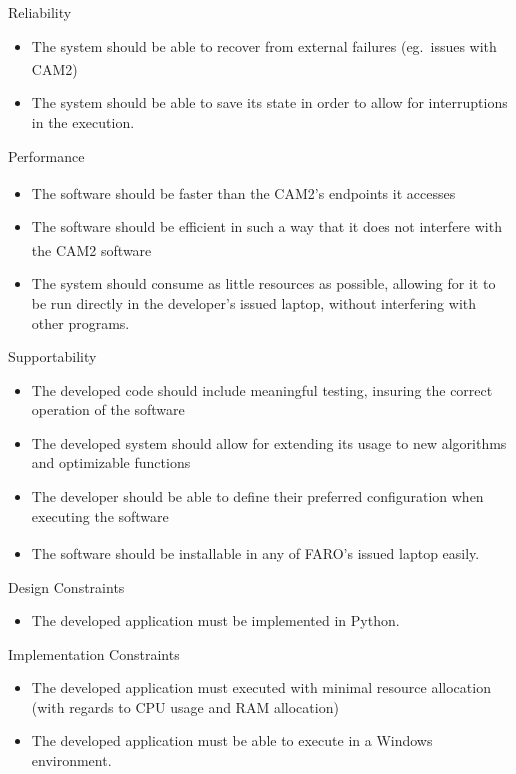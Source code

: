 \documentclass[10pt]{beamer}
\newcommand{\farons}[0]{FARO\textsuperscript{\textregistered}}
\begin{document}
  \begin{frame}{Reliability}
    \begin{itemize}
      \item The system should be able to recover from external failures (eg.\ issues with CAM2\textsuperscript{\textregistered})
      \item The system should be able to save its state in order to allow for interruptions in the execution.
    \end{itemize}
  \end{frame}
  \begin{frame}{Performance}
    \begin{itemize}
      \item The software should be faster than the CAM2\textsuperscript{\textregistered}'s endpoints it accesses
      \item The software should be efficient in such a way that it does not interfere with the CAM2\textsuperscript{\textregistered} software
      \item The system should consume as little resources as possible, allowing for it to be run directly in the developer's issued laptop, without interfering with other programs.
    \end{itemize}
  \end{frame}
  \begin{frame}{Supportability}
    \begin{itemize}
      \item The developed code should include meaningful testing, insuring the correct operation of the software
      \item The developed system should allow for extending its usage to new algorithms and optimizable functions
      \item The developer should be able to define their preferred configuration when executing the software
      \item The software should be installable in any of \farons's issued laptop easily.
    \end{itemize}
  \end{frame}
  \begin{frame}{Design Constraints}
    \begin{itemize}
      \item The developed application must be implemented in Python.
    \end{itemize}
  \end{frame}
  \begin{frame}{Implementation Constraints}
    \begin{itemize}
      \item The developed application must executed with minimal resource allocation (with regards to CPU usage and RAM allocation)
      \item The developed application must be able to execute in a Windows environment.
    \end{itemize}
  \end{frame}
\end{document}

